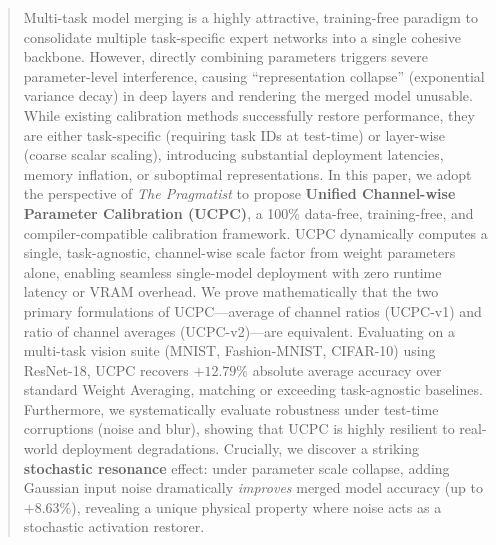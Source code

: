 \documentclass{article}
\theoremstyle{plain}
\theoremstyle{definition}
\theoremstyle{remark}
\begin{document}

\printAffiliationsAndNotice{}

\begin{abstract}
  Multi-task model merging is a highly attractive, training-free paradigm to consolidate multiple task-specific expert networks into a single cohesive backbone. However, directly combining parameters triggers severe parameter-level interference, causing ``representation collapse'' (exponential variance decay) in deep layers and rendering the merged model unusable. While existing calibration methods successfully restore performance, they are either task-specific (requiring task IDs at test-time) or layer-wise (coarse scalar scaling), introducing substantial deployment latencies, memory inflation, or suboptimal representations. In this paper, we adopt the perspective of \textit{The Pragmatist} to propose \textbf{Unified Channel-wise Parameter Calibration (UCPC)}, a 100\% data-free, training-free, and compiler-compatible calibration framework. UCPC dynamically computes a single, task-agnostic, channel-wise scale factor from weight parameters alone, enabling seamless single-model deployment with zero runtime latency or VRAM overhead. We prove mathematically that the two primary formulations of UCPC---average of channel ratios (UCPC-v1) and ratio of channel averages (UCPC-v2)---are equivalent. Evaluating on a multi-task vision suite (MNIST, Fashion-MNIST, CIFAR-10) using ResNet-18, UCPC recovers $+12.79\%$ absolute average accuracy over standard Weight Averaging, matching or exceeding task-agnostic baselines. Furthermore, we systematically evaluate robustness under test-time corruptions (noise and blur), showing that UCPC is highly resilient to real-world deployment degradations. Crucially, we discover a striking \textbf{stochastic resonance} effect: under parameter scale collapse, adding Gaussian input noise dramatically \textit{improves} merged model accuracy (up to $+8.63\%$), revealing a unique physical property where noise acts as a stochastic activation restorer.
\end{abstract}
\end{document}
